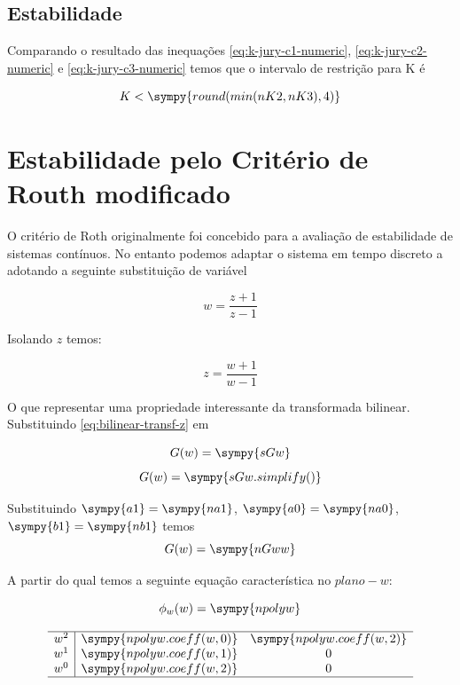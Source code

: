 \documentclass[a4paper,11pt]{article}
\begin{document}
\subsection{Estabilidade}

Comparando o resultado das inequações \ref{eq:k-jury-c1-numeric}, \ref{eq:k-jury-c2-numeric} e \ref{eq:k-jury-c3-numeric} temos que o intervalo de restrição para K é

\begin{equation}\label{eq:k-jury-result}
    K < \sympy{round(min(nK2,nK3),4)}
\end{equation}

\section{Estabilidade pelo Critério de Routh modificado}

O critério de Roth originalmente foi concebido para a avaliação de estabilidade de sistemas contínuos. No entanto podemos adaptar o sistema em tempo discreto a adotando a seguinte substituição de variável

\begin{equation}\label{eq:bilinear-transf-w}
    w = \frac{z+1}{z-1}
\end{equation}

Isolando $z$ temos:

\begin{equation}\label{eq:bilinear-transf-z}
    z = \frac{w+1}{w-1}
\end{equation}

O que representar uma propriedade interessante da transformada bilinear. Substituindo \ref{eq:bilinear-transf-z} em

$$G(w) = \sympy{sGw}$$
$$G(w) = \sympy{sGw.simplify()}$$

Substituindo $\sympy{a1} = \sympy{na1}$, $\sympy{a0} = \sympy{na0}$, $\sympy{b1} = \sympy{nb1}$ temos
$$G(w) = \sympy{nGww}$$

A partir do qual temos a seguinte equação característica no $plano-w$:

\begin{equation}
    \phi_w(w) = \sympy{npolyw}
\end{equation}


\begin{table}[H]
    \centering
    $$
    \begin{array}{l|cc}
     \hline
     w^2 & \sympy{npolyw.coeff(w,0)} & \sympy{npolyw.coeff(w,2)}  \\
     w^1 & \sympy{npolyw.coeff(w,1)}  & 0 \\
     w^0 & \sympy{npolyw.coeff(w,2)}  & 0 \\
     \hline
    \end{array}
    $$
\end{table}
\end{document}
